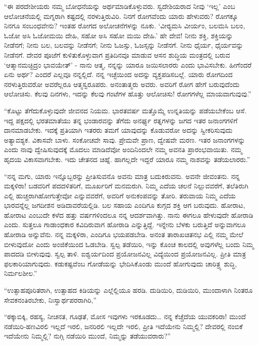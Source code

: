  “ಈ ಪರದೇಶೀಯರು ನಮ್ಮ ಬೋಧನೆಯನ್ನು ಅರ್ಥಮಾಡಿಕೊಳ್ಳುವರು. ಸ್ವದೇಶಿಯರಾದ ನೀವು ‘ಇಲ್ಲ’ ಎಂಬ ಆಲೋಚನೆಯಲ್ಲಿ ಮಗ್ನರಾಗಿ ಕಷ್ಟದಲ್ಲಿ ನರಳುತ್ತಿರುವಿರಿ. ನಿನಗೆ ರೋಗವೆಂದು ಯಾರು ಹೇಳುವರು? ರೋಗಕ್ಕೂ ನಿನಗೂ ಸಂಬಂಧವೇನು? ಇಂತಹ ರೋಗದ ಅಲೋಚನೆಗಳನ್ನು ನೂಕು. ‘ವೀರ‍್ಯಮಸಿ ವೀರ್ಯಂ, ಬಲಮಸಿ ಬಲಂ, ಓಜೋ ಅಸಿ ಓಜೋಮಯಿ ದೇಹಿ, ಸಹೋ ಅಸಿ ಸಹೋ ಮಯಿ ದೇಹಿ.’ ಹೇ ದೇವ! ನೀನು ಶಕ್ತಿ, ಶಕ್ತಿಯನ್ನು ನೀಡೆನಗೆ; ನೀನು ಬಲ, ಬಲವನ್ನು ನೀಡೆನಗೆ; ನೀನು ಓಜಸ್ಸು, ಓಜಸ್ಸನ್ನು ನೀಡೆನಗೆ. ನೀನು ಧೈರ್ಯ, ಧೈರ್ಯವನ್ನು ನೀಡೆನಗೆ. ದೇವರ ಪೂಜೆಗೆ ಕುಳಿತುಕೊಳ್ಳುವಾಗ ಪ್ರತಿದಿನವೂ ಮಾಡುವ ಆಸನ ಶುದ್ಧಿಯ ಮಂತ್ರದಲ್ಲಿ ಬರುವ ‘ಆತ್ಮಾನಮಚ್ಛಿದ್ರಂ ಭಾವಯೇತ್’ - ನಾನು ಆತ್ಮ, ನನ್ನನ್ನು ಯಾರೂ ಜಯಿಸಲಾರರು ಎಂದು ಭಾವಿಸಬೇಕು. ಹೀಗೆಂದರೆ ಏನು ಅರ್ಥ? ಎಂದರೆ ಎಲ್ಲವೂ ನನ್ನಲ್ಲಿದೆ. ನನ್ನ ಇಚ್ಛೆಯಿಂದ ಅದನ್ನು ವ್ಯಕ್ತಪಡಿಸಬಲ್ಲೆ. ಯಾರು ರೋಗದಿಂದ ನರಳುತ್ತಿರುವರೋ ಅವರೆಲ್ಲರೂ ಆತ್ಮಸ್ವರೂಪರು. ಅನಂತಾತ್ಮರು ಅವರು. ಅವರಿಗೆ ರೋಗ ಹೇಗೆ ಬರುವುದೆಂದು ಆಲೋಚಿಸು. ಕೆಲವು ದಿನಗಳು, ಇದನ್ನು ಕೆಲವು ಗಂಟೆಗಳ ಹೊತ್ತು ಆಲೋಚಿಸು! ರೋಗಗಳೆಲ್ಲ ಮಾಯವಾಗುವುವು.” 

 “ಕೊಟ್ಟು ತೆಗೆದುಕೊಳ್ಳುವುದೇ ಜೀವನದ ನಿಯಮ. ಭಾರತವರ್ಷ ಮತ್ತೊಮ್ಮೆ ಉನ್ನತಿಯನ್ನು ಪಡೆಯಬೇಕೆಂಬ ಆಸೆ. ಇದ್ದ ಪಕ್ಷದಲ್ಲಿ ಭರತಮಾತೆಯು ತನ್ನ ಭಂಡಾರವನ್ನು ತೆಗೆದು ಅನರ್ಘ್ಯ ರತ್ನಗಳನ್ನು ಜಗದ ಇತರ ಜನಾಂಗಗಳಿಗೆ ದಾನಮಾಡಬೇಕು. ಇದಕ್ಕೆ ಪ್ರತಿಯಾಗಿ ಇತರರು ತಮಗೆ ಯಾವುದನ್ನು ಕೊಡುವರೋ ಅದನ್ನು ಸ್ವೀಕರಿಸುವುದು ಅತ್ಯಾವಶ್ಯಕ. ವಿಕಾಸವೇ ಬಾಳು. ಸಂಕೋಚವೇ ಸಾವು. ಪ್ರೇಮವೇ ಪ್ರಾಣ, ದ್ವೇಷವೇ ಮರಣ. ಇತರ ಜನಾಂಗಗಳನ್ನು ಎಂದು ನಾವು ದ್ವೇಷಿಸುವುದಕ್ಕೆ ಮೊದಲು ಮಾಡಿದೆವೋ ಅಂದಿನಿಂದಲೇ ನಮ್ಮ ಅವನತಿ ಪ್ರಾರಂಭವಾಯಿತು. ನಮ್ಮ ಹೃದಯ ವಿಕಾಸವಾಗಬೇಕು. ಇದು ಚೇತನದ ಚಿಹ್ನೆ. ಹಾಗಲ್ಲದೇ ಇದ್ದರೆ ಯಾರೂ ನಮ್ಮ ನಾಶವನ್ನು ತಡೆಯಲಾರರು.” 

 “ನನ್ನ ಮಗು, ಯಾರು ಇನ್ನೊಬ್ಬರನ್ನು ಪ್ರೀತಿಸುವನೊ ಅವನು ಮಾತ್ರ ಬದುಕಿರುವನು. ಅವನೇ ಜೀವಂತನು. ನನ್ನ ಮಕ್ಕಳಿರಾ!‌ ಬಡವರಿಗೆ ಪದದಳಿತರಿಗೆ, ಮೂರ್ಖರಿಗೆ ಮನಮರುಗಿ. ನಿಮ್ಮ ಎದೆಯ ಚಲನೆ ನಿಲ್ಲುವವರೆಗೆ, ತಲೆತಿರುಗಿ ಎಲ್ಲಿ ಹುಚ್ಚರಾಗಿಹೋಗುತ್ತೇವೋ ಎನ್ನುವವರೆಗೆ, ಅವರಿಗೆ ಅನುಕಂಪವನ್ನು ತೋರಿ. ತರುವಾಯ ನಿಮ್ಮ ಎದೆಯ ಭಾರವನ್ನೆಲ್ಲ ಜಗದೀಶನ ಅಡಿದಾವರೆಯಲ್ಲಿಡಿ. ಬಲ ಸಹಾಯ ಎಂದಿಗೂ ಕುಗ್ಗದ ಶಕ್ತಿ ಆಗ ಬರುವುದು. ಹೋರಾಟ, ಹೋರಾಟ ಎಂಬುದೇ ಕಳೆದ ಹತ್ತು ವರ್ಷಗಳಿಂದಲೂ ನನ್ನ ಆದರ್ಶವಾಗಿತ್ತು. ನಾನು ಈಗಲೂ ಹೇಳುವುದೇ ಹೋರಾಡಿ ಎಂದು. ಸುತ್ತಲೂ ಗಾಡಾಂಧಕಾರ ಕವಿದಿರುವಾಗ ಹೋರಾಡಿ ಎನ್ನುತ್ತಿದ್ದೆ. ಇನ್ನೇನು ಬೆಳಕು ಬರುತ್ತಿದೆ ಅನ್ನುವಾಗಲೂ ಹೋರಾಡಿ ಅನ್ನುವೆನು. ನನ್ನ ಮಕ್ಕಳಿರಾ, ಎಂದಿಗೂ ಭಯಪಡಬೇಡಿ. ಅನಂತ ತಾರಾಖಚಿತನಭ ಎಲ್ಲಿ ನಮ್ಮ ಮೇಲೆ ಬೀಳುವುದೋ ಎಂದು ಅಂಜಿಕೆಯಿಂದ ಓಡಬೇಡಿ. ಸ್ವಲ್ಪ ತಡೆಯಿರಿ, ಇನ್ನು ಕೊಂಚ ಕಾಲದಲ್ಲಿ ಅವುಗಳೆಲ್ಲ ಬಂದು ನಿಮ್ಮ ಪಾದದಡಿ ಬೀಳುವುವು. ಸ್ವಲ್ಪ ತಾಳಿ. ಐಶ್ವರ್ಯದಿಂದ ಪ್ರಯೋಜನವಿಲ್ಲ ವಿದ್ಯೆಯಿಂದ ಪ್ರಯೋಜನವಿಲ್ಲ. ಪ್ರೀತಿ ಮಾತ್ರ ಫಲಕಾರಿಯಾಗುವುದು. ಕಡುಕಷ್ಟವೆಂಬ ಗೋಡೆಯನ್ನು ಭೇದಿಸಿಕೊಂಡು ಮುಂದೆ ಹೋಗುವುದು ಚಾರಿತ್ರ್ಯ ಶುದ್ಧಿ, ನಿರ್ಮಲಶೀಲ.” 

 “ಉತ್ಸಾಹಪೂರಿತರಾಗಿ, ಉತ್ಸಾಹದ ಕಿಡಿಯನ್ನು ಎಲ್ಲೆಲ್ಲಿಯೂ ಹರಡಿ. ದುಡಿಯಿರಿ, ದುಡಿಯಿರಿ, ಮುಂದಾಳಾಗಿ ನಿಂತರೂ ಸೇವಕನಂತಿರಬೇಕು, ನಿಃಸ್ವಾರ್ಥಪರರಾಗಿರಿ,” 

 “ಠಕ್ಕಾಬಿಕ್ಕಿ, ರಹಸ್ಯ, ನೀಚನತ, ಗೂಢತೆ, ಮೋಸ ಇವುಗಳು ಇರಕೂಡದು… ನನ್ನ ಕೆಚ್ಚೆದೆಯ ಯುವಕರಿರಾ! ಮುಂದೆ ನಡೆಯಿರಿ-ಹಣವಿರಲಿ ಇಲ್ಲದೆ ಇರಲಿ, ಜನರಿರಲಿ ಇಲ್ಲದೇ ಇರಲಿ, ಪ್ರೀತಿ ಇದೆಯೇನು ನಿಮ್ಮಲ್ಲಿ? ದೇವರಲ್ಲಿ ನಂಬಿಕೆ ಇದೆಯೇನು ನಿಮ್ಮಲ್ಲಿ? ನುಗ್ಗಿ ನಡೆಯಿರಿ ಮುಂದೆ, ನಿಮ್ಮನ್ನು ತಡೆಯುವರಾರು?” 

